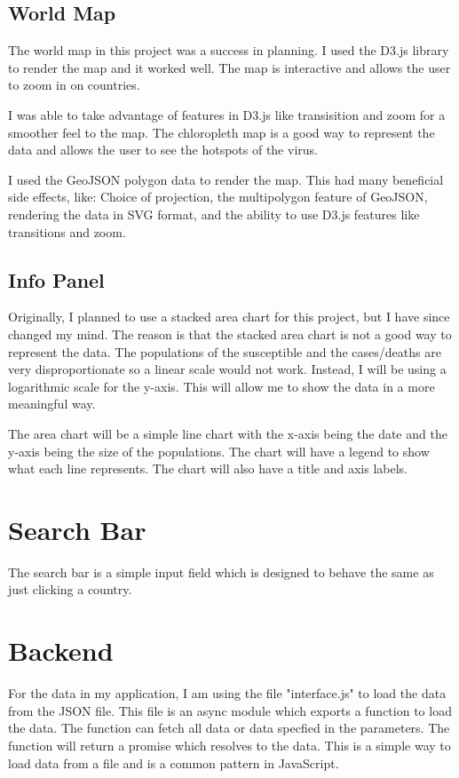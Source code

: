 \documentclass{report}
\begin{document}
\subsection{World Map}
The world map in this project was a success in planning. I used the D3.js library to render the map and it worked well. The map is interactive and allows the user to zoom in on countries.

I was able to take advantage of features in D3.js like transisition and zoom for a smoother feel to the map. The chloropleth map is a good way to represent the data and allows the user to see the hotspots of the virus.

I used the GeoJSON polygon data to render the map. This had many beneficial side effects, like: Choice of projection, the multipolygon feature of GeoJSON, rendering the data in SVG format, and the ability to use D3.js features like transitions and zoom.

\subsection{Info Panel}
Originally, I planned to use a stacked area chart for this project, but I have since changed my mind. The reason is that the stacked area chart is not a good way to represent the data. The populations of the susceptible and the cases/deaths are very disproportionate so a linear scale would not work. Instead, I will be using a logarithmic scale for the y-axis. This will allow me to show the data in a more meaningful way.

The area chart will be a simple line chart with the x-axis being the date and the y-axis being the size of the populations. The chart will have a legend to show what each line represents. The chart will also have a title and axis labels.

\section{Search Bar}
The search bar is a simple input field which is designed to behave the same as just clicking a country. 

\section{Backend}
For the data in my application, I am using the file "interface.js" to load the data from the JSON file. This file is an async module which exports a function to load the data. The function can fetch all data or data specfied in the parameters. The function will return a promise which resolves to the data. This is a simple way to load data from a file and is a common pattern in JavaScript.
\end{document}
